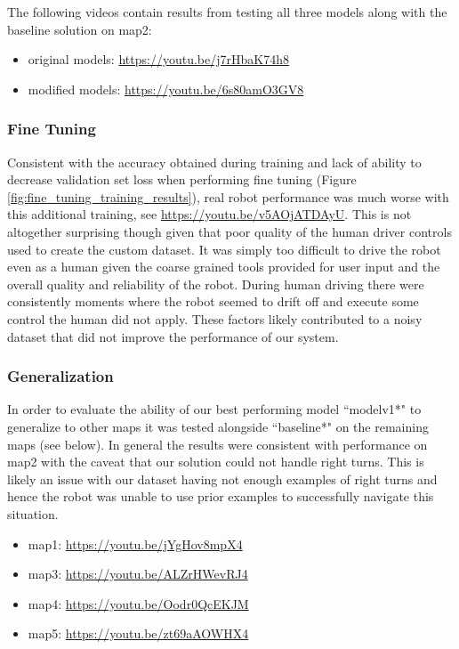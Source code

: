 \documentclass{article}
\begin{document}
The following videos contain results from testing all three models along with the baseline solution on map2:
\begin{itemize}
    \item original models: \url{https://youtu.be/j7rHbaK74h8}
    \item modified models: \url{https://youtu.be/6s80amO3GV8}
\end{itemize}

\subsubsection{Fine Tuning}

Consistent with the accuracy obtained during training and lack of ability to decrease validation set loss when performing fine tuning (Figure \ref{fig:fine_tuning_training_results}), real robot performance was much worse with this additional training, see \url{https://youtu.be/v5AOjATDAyU}. This is not altogether surprising though given that poor quality of the human driver controls used to create the custom dataset. It was simply too difficult to drive the robot even as a human given the coarse grained tools provided for user input and the overall quality and reliability of the robot. During human driving there were consistently moments where the robot seemed to drift off and execute some control the human did not apply. These factors likely contributed to a noisy dataset that did not improve the performance of our system.

\subsubsection{Generalization}

In order to evaluate the ability of our best performing model ``modelv1*" to generalize to other maps it was tested alongside ``baseline*" on the remaining maps (see below). In general the results were consistent with performance on map2 with the caveat that our solution could not handle right turns. This is likely an issue with our dataset having not enough examples of right turns and hence the robot was unable to use prior examples to successfully navigate this situation.

\begin{itemize}
    \item map1: \url{https://youtu.be/jYgHov8mpX4}
    \item map3: \url{https://youtu.be/ALZrHWevRJ4}
    \item map4: \url{https://youtu.be/Oodr0QcEKJM}
    \item map5: \url{https://youtu.be/zt69aAOWHX4}
\end{itemize}
\end{document}
